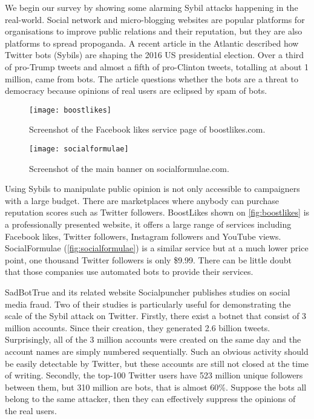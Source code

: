 We begin our survey by showing some alarming Sybil attacks happening in the
real-world. Social network and micro-blogging websites are popular platforms for
organisations to improve public relations and their reputation, but they are
also platforms to spread propoganda. A recent article in the Atlantic described
how Twitter bots (Sybils) are shaping the 2016 US presidential
election\cite{atlantictwitterbots}. Over a third of pro-Trump tweets and almost
a fifth of pro-Clinton tweets, totalling at about 1 million, came from bots. The
article questions whether the bots are a threat to democracy because opinions of
real users are eclipsed by spam of bots.

\begin{figure}
  \centering
  \texttt{[image: boostlikes]}
  \caption{Screenshot of the Facebook likes service page of boostlikes.com.}
  \label{fig:boostlikes}
\end{figure}

\begin{figure*}
  \centering
  \texttt{[image: socialformulae]}
  \caption{Screenshot of the main banner on socialformulae.com.}
  \label{fig:socialformulae}
\end{figure*}

Using Sybils to manipulate public opinion is not only accessible to campaigners
with a large budget. There are marketplaces where anybody can purchase
reputation scores such as Twitter followers. BoostLikes shown on
\autoref{fig:boostlikes} is a professionally presented website, it offers a
large range of services including Facebook likes, Twitter followers, Instagram
followers and YouTube views. SocialFormulae (\autoref{fig:socialformulae}) is a
similar service but at a much lower price point, one thousand Twitter followers
is only \$9.99. There can be little doubt that those companies use automated
bots to provide their services.

SadBotTrue and its related website Socialpuncher publishes studies on social
media fraud. Two of their studies is particularly useful for demonstrating the
scale of the Sybil attack on Twitter. Firstly, there exist a botnet that consist
of 3 million accounts. Since their creation, they generated 2.6 billion tweets.
Surprisingly, all of the 3 million accounts were created on the same day and the
account names are simply numbered sequentially\cite{sadbottrue}. Such an obvious
activity should be easily detectable by Twitter, but these accounts are still
not closed at the time of writing. Secondly, the top-100 Twitter users have 523
million unique followers between them, but 310 million are bots, that is almost
60\%\cite{socialpuncher}. Suppose the bots all belong to the same attacker, then
they can effectively suppress the opinions of the real users.

